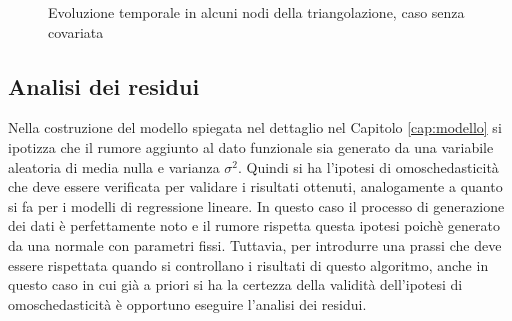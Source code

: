 \documentclass[a4paper,11pt,twoside,openright]{book}							%
\begin{document}
\begin{figure}[t]
	\centering
	\caption{Evoluzione temporale in alcuni nodi della triangolazione, caso senza covariata}
	\label{fig:DomC_ris2}
\end{figure}

\subsection{Analisi dei residui}
Nella costruzione del modello spiegata nel dettaglio nel Capitolo \ref{cap:modello} si ipotizza che il rumore aggiunto al dato funzionale sia generato da una variabile aleatoria di media nulla e varianza $\sigma^2$. Quindi si ha l'ipotesi di omoschedasticità che deve essere verificata per validare i risultati ottenuti, analogamente a quanto si fa per i modelli di regressione lineare. In questo caso il processo di generazione dei dati è perfettamente noto e il rumore rispetta questa ipotesi poichè generato da una normale con parametri fissi. Tuttavia, per introdurre una prassi che deve essere rispettata quando si controllano i risultati di questo algoritmo, anche in questo caso in cui già a priori si ha la certezza della validità dell'ipotesi di omoschedasticità è opportuno eseguire l'analisi dei residui.
\end{document}
